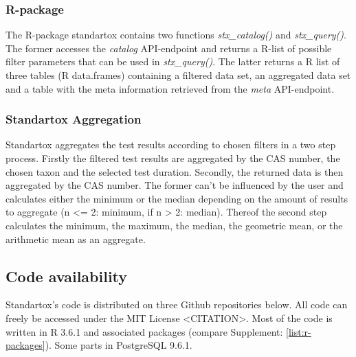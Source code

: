 \subsubsection*{R-package}
The R-package standartox contains two functions \textit{stx\_catalog()} and \textit{stx\_query()}. The former accesses the \textit{catalog} API-endpoint and returns a R-list of possible filter parameters that can be used in \textit{stx\_query()}. The latter returns a R list of three tables (R data.frames) containing a filtered data set, an aggregated data set and a table with the meta information retrieved from the \textit{meta} API-endpoint.

\subsubsection*{Standartox Aggregation}
Standartox aggregates the test results according to chosen filters in a two step process. Firstly the filtered test results are aggregated by the CAS number, the chosen taxon and the selected test duration. Secondly, the returned data is then aggregated by the CAS number. The former can't be influenced by the user and calculates either the minimum or the median depending on the amount of results to aggregate (n <= 2: minimum, if n > 2: median). Thereof the second step calculates the minimum, the maximum, the median, the geometric mean, or the arithmetic mean as an aggregate. 

\subsection*{Code availability}

Standartox's code is distributed on three Github repositories below. All code can freely be accessed under the MIT License <CITATION>. Most of the code is written in R 3.6.1 and associated packages (compare Supplement: \ref{list:r-packages}). Some parts in PostgreSQL 9.6.1.

